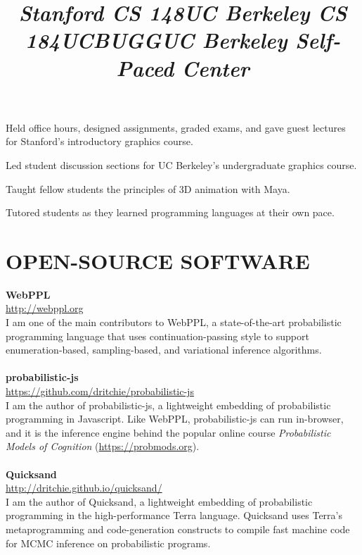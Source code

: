 \documentclass[line,margin]{res}
\begin{document}
\begin{resume}
\title{\emph{Stanford CS 148}}
\begin{position}
Held office hours, designed assignments, graded exams, and gave guest lectures for Stanford's introductory graphics course.
\end{position}

\title{\emph{UC Berkeley CS 184}}
\begin{position}
Led student discussion sections for UC Berkeley's undergraduate graphics course.
\end{position}

\title{\emph{UCBUGG}}
\begin{position}
Taught fellow students the principles of 3D animation with Maya.
\end{position}

\title{\emph{UC Berkeley Self-Paced Center}}
\begin{position}
Tutored students as they learned programming languages at their own pace.
\end{position}




\section{OPEN-SOURCE SOFTWARE}

\textbf{WebPPL} \\
\url{http://webppl.org} \\
I am one of the main contributors to WebPPL, a state-of-the-art probabilistic programming language that uses continuation-passing style to support enumeration-based, sampling-based, and variational inference algorithms.
\\ \\
\textbf{probabilistic-js} \\
\url{https://github.com/dritchie/probabilistic-js} \\
I am the author of probabilistic-js, a lightweight embedding of probabilistic programming in Javascript. Like WebPPL, probabilistic-js can run in-browser, and it is the inference engine behind the popular online course \emph{Probabilistic Models of Cognition} (\url{https://probmods.org}).
\\ \\
\textbf{Quicksand} \\
\url{http://dritchie.github.io/quicksand/} \\
I am the author of Quicksand, a lightweight embedding of probabilistic programming in the high-performance Terra language. Quicksand uses Terra's metaprogramming and code-generation constructs to compile fast machine code for MCMC inference on probabilistic programs.



\end{resume}
\end{document}
